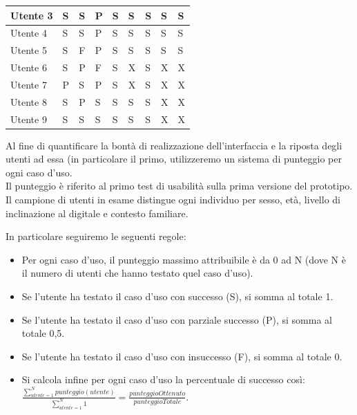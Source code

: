 \begin{table}[ht]
{\begin{tabular}{l|l|l|l|l|l|l|l|l|}
                \multicolumn{1}{|l|}{Utente 3} & S & S & P & S & S & S & S & S \\ \hline
                \multicolumn{1}{|l|}{Utente 4} & S & S & P & S & S & S & S & S \\ \hline
                \multicolumn{1}{|l|}{Utente 5} & S & F & P & S & S & S & S & S \\ \hline
                \multicolumn{1}{|l|}{Utente 6} & S & P & F & S & X & S & X & X \\ \hline %
                \multicolumn{1}{|l|}{Utente 7} & P & S & P & S & X & S & X & X \\ \hline %
                \multicolumn{1}{|l|}{Utente 8} & S & P & S & S & S & S & X & X \\ \hline %
                \multicolumn{1}{|l|}{Utente 9} & S & S & S & S & S & S & X & X \\ \hline %
                \end{tabular}
                }
            \end{table}
            
            Al fine di quantificare la bontà di realizzazione dell'interfaccia e la riposta degli utenti ad essa (in particolare il primo, utilizzeremo un sistema di punteggio per ogni caso d'uso. \\
            Il punteggio è riferito al primo test di usabilità sulla prima versione del prototipo. \\
            Il campione di utenti in esame distingue ogni individuo per sesso, età, livello di inclinazione al digitale e contesto familiare.
            
            \noindent In particolare seguiremo le seguenti regole:
            \begin{itemize}
                \item Per ogni caso d'uso, il punteggio massimo attribuibile è da 0 ad N (dove N è il numero di utenti che hanno testato quel caso d'uso).
                \item Se l'utente ha testato il caso d'uso con successo (S), si somma al totale 1.
                \item Se l'utente ha testato il caso d'uso con parziale successo (P), si somma al totale 0,5.
                \item Se l'utente ha testato il caso d'uso con insuccesso (F), si somma al totale 0.
                \item Si calcola infine per ogni caso d'uso la percentuale di successo così:
                \vspace{0.5cm} \\
                $\displaystyle\frac{\sum_{utente = 1} ^{N}punteggio(utente)}{\sum_{utente = 1} ^{N}1} = \frac{punteggioOttenuto}{punteggioTotale}$.
            \end{itemize}


